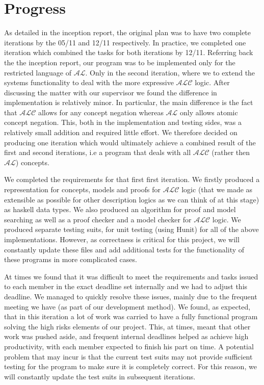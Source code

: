 \section*{Progress}

As detailed in the inception report, the original plan was to have two complete iterations by the 05/11 and 12/11 respectively. In practice, we completed one iteration which combined the tasks for both iterations by 12/11. Referring back the the inception report, our program was to be implemented only for the restricted language of $\mathcal{AL}$. Only in the second iteration, where we to extend the systems functionality to deal with the more expressive $\mathcal{ALC}$ logic. After discussing the matter with our supervisor we found the difference in implementation is relatively minor. In particular, the main difference is the fact that $\mathcal{ALC}$ allows for any concept negation whereas $\mathcal{AL}$ only allows atomic concept negation. This, both in the implementation and testing sides, was a relatively small addition and required little effort. We therefore decided on producing one iteration which would ultimately achieve a combined result of the first and second iterations, i.e a program that deals with all $\mathcal{ALC}$ (rather then $\mathcal{AL}$) concepts.

We completed the requirements for that first first iteration. We firstly produced a representation for concepts, models and proofs for $\mathcal{ALC}$ logic (that we made as extensible as possible for other description logics as we can think of at this stage) as haskell data types. We also produced an algorithm for proof and model searching as well as a proof checker and a model checker for $\mathcal{ALC}$ logic. We produced separate testing suits, for unit testing (using Hunit) for all of the above implementations. However, as correctness is critical for this project, we will constantly update these files and add additional tests for the functionality of these programs in more complicated cases.  

At times we found that it was difficult to meet the requirements and tasks issued to each member in the exact deadline set internally and we had to adjust this deadline. We managed to quickly resolve these issues, mainly due to the frequent meeting we have (as part of our development method). We found, as expected, that in this iteration a lot of work was carried to have a fully functional program solving the high risks elements of our project. This, at times, meant that other work was pushed aside, and frequent internal deadlines helped as achieve high productivity, with each member expected to finish his part on time. A potential problem that may incur is that the current test suits may not provide sufficient testing for the program to make sure it is completely correct. For this reason, we will constantly update the test suits in subsequent iterations.

